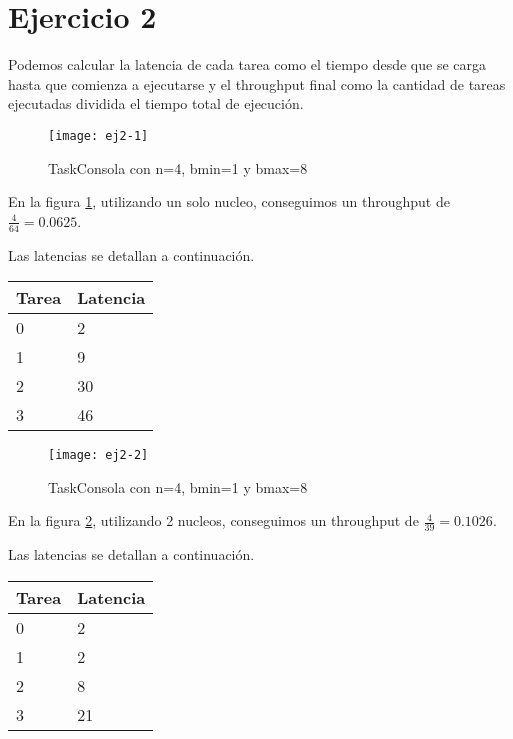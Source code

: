 \section{Ejercicio 2}
\label{sec:ej2}

Podemos calcular la latencia de cada tarea como el tiempo desde que se carga hasta que comienza a ejecutarse y el throughput final como la cantidad de tareas ejecutadas dividida el tiempo total de ejecución.

\begin{figure}[H]
    \centering
    \texttt{[image: ej2-1]}
    \caption{TaskConsola con n=4, bmin=1 y bmax=8}
    \label{fig:ej2.1}
\end{figure}

En la figura \ref{fig:ej2.1}, utilizando un solo nucleo, conseguimos un throughput de $\frac{4}{64} = 0.0625$.

Las latencias se detallan a continuación.

\begin{center}
    \begin{tabular}{| l | l |}
        \hline
        Tarea & Latencia \\ \hline
        0 & 2 \\
        1 & 9 \\
        2 & 30 \\
        3 & 46 \\
        \hline
    \end{tabular}
\end{center}

\begin{figure}[H]
    \centering
    \texttt{[image: ej2-2]}
    \caption{TaskConsola con n=4, bmin=1 y bmax=8}
    \label{fig:ej2.2}
\end{figure}

En la figura \ref{fig:ej2.2}, utilizando 2 nucleos, conseguimos un throughput de $\frac{4}{39} = 0.1026$.

Las latencias se detallan a continuación.

\begin{center}
    \begin{tabular}{| l | l |}
        \hline
        Tarea & Latencia \\ \hline
        0 & 2 \\
        1 & 2 \\
        2 & 8 \\
        3 & 21 \\
        \hline
    \end{tabular}
\end{center}

